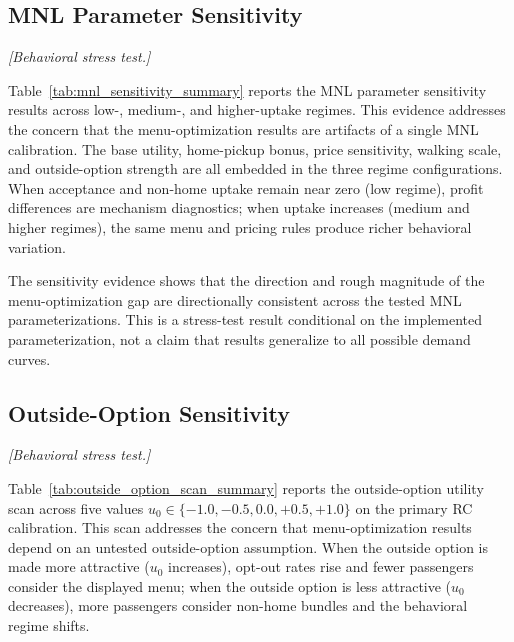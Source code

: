 \subsection{MNL Parameter Sensitivity}
\label{sec:mnl_sensitivity}

\textit{[Behavioral stress test.]}


Table~\ref{tab:mnl_sensitivity_summary} reports the MNL parameter sensitivity results across low-, medium-, and higher-uptake regimes. This evidence addresses the concern that the menu-optimization results are artifacts of a single MNL calibration. The base utility, home-pickup bonus, price sensitivity, walking scale, and outside-option strength are all embedded in the three regime configurations. When acceptance and non-home uptake remain near zero (low regime), profit differences are mechanism diagnostics; when uptake increases (medium and higher regimes), the same menu and pricing rules produce richer behavioral variation.

The sensitivity evidence shows that the direction and rough magnitude of the menu-optimization gap are directionally consistent across the tested MNL parameterizations. This is a stress-test result conditional on the implemented parameterization, not a claim that results generalize to all possible demand curves.

\subsection{Outside-Option Sensitivity}
\label{sec:outside_option_sensitivity}

\textit{[Behavioral stress test.]}


Table~\ref{tab:outside_option_scan_summary} reports the outside-option utility scan across five values $u_0 \in \{-1.0, -0.5, 0.0, +0.5, +1.0\}$ on the primary RC calibration. This scan addresses the concern that menu-optimization results depend on an untested outside-option assumption. When the outside option is made more attractive ($u_0$ increases), opt-out rates rise and fewer passengers consider the displayed menu; when the outside option is less attractive ($u_0$ decreases), more passengers consider non-home bundles and the behavioral regime shifts.

